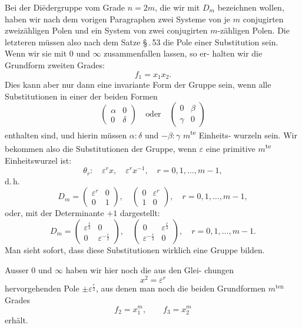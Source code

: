 \documentclass[12pt,a4paper]{article}
\theoremstyle{plain}
\theoremstyle{definition}
\theoremstyle{remark}
\begin{document}
Bei der Di\"edergruppe vom Grade $n = 2m$, die wir mit $D_m$
bezeichnen wollen, haben wir nach dem vorigen Paragraphen
zwei Systeme von je $m$ conjugirten zweiz\"ahligen Polen und ein
System von zwei conjugirten $m$-z\"ahligen Polen. Die letzteren
m\"ussen also nach dem Satze \S\,.\,53 die Pole einer Substitution
sein. Wenn wir sie mit $0$ und $\infty$ zusammenfallen lassen, so er-
halten wir die Grundform zweiten Grades:
\[
f_1 = x_1 x_2.
\]
Dies kann aber nur dann eine invariante Form der Gruppe
sein, wenn alle Substitutionen in einer der beiden Formen
\[
\begin{pmatrix}\alpha & 0\\ 0 & \delta\end{pmatrix}\quad\text{oder}\quad
\begin{pmatrix}0 & \beta\\ \gamma & 0\end{pmatrix}
\]
enthalten sind, und hierin m\"ussen $\alpha : \delta$ und $-\beta : \gamma$ $m$\textsuperscript{te} Einheits-
wurzeln sein. Wir bekommen also die Substitutionen der Gruppe,
wenn $\varepsilon$ eine primitive $m$\textsuperscript{te} Einheitswurzel ist:
\[
\theta_r:\quad \varepsilon^r x,\quad \varepsilon^r x^{-1},\quad r = 0, 1, \ldots, m-1,
\]
d.\,h.
\begin{equation}\label{eq:55_5}
D_m = \begin{pmatrix}\varepsilon^r & 0\\ 0 & 1\end{pmatrix},\quad
\begin{pmatrix}0 & \varepsilon^r\\ 1 & 0\end{pmatrix},\quad r = 0, 1, \ldots, m-1,\tag{5}
\end{equation}
oder, mit der Determinante $+1$ dargestellt:
\begin{equation}\label{eq:55_6}
D_m = \begin{pmatrix}\varepsilon^{\frac{r}{2}} & 0\\ 0 & \varepsilon^{-\frac{r}{2}}\end{pmatrix},\quad
\begin{pmatrix}0 & \varepsilon^{\frac{r}{2}}\\ \varepsilon^{-\frac{r}{2}} & 0\end{pmatrix},\quad r = 0, 1, \ldots, m-1.\tag{6}
\end{equation}
Man sieht sofort, dass diese Substitutionen wirklich eine
Gruppe bilden.

Ausser $0$ und $\infty$ haben wir hier noch die aus den Glei-
chungen
\[
x^2 = \varepsilon^r
\]
hervorgehenden Pole $\pm\varepsilon^{\frac{r}{2}}$, aus denen man noch die beiden
Grundformen $m^{\text{ten}}$ Grades
\begin{equation}\label{eq:55_7}
f_2 = x_1^m,\qquad f_3 = x_2^m\tag{7}
\end{equation}
erh\"alt.
\end{document}
